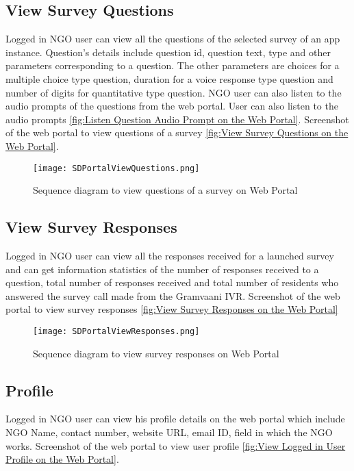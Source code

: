 \subsection{View Survey Questions}
Logged in NGO user can view all the questions of the selected survey of an app instance. Question's details include question id, question text, type and other parameters corresponding to a question. The other parameters are choices for a multiple choice type question, duration for a voice response type question and number of digits for quantitative type question. NGO user can also listen to the audio prompts of the questions from the web portal. User can also listen to the audio prompts \ref{fig:Listen Question Audio Prompt on the Web Portal}. Screenshot of the web portal to view questions of a survey \ref{fig:View Survey Questions on the Web Portal}.\\
\begin{figure}[H]
    \centering
	\texttt{[image: SDPortalViewQuestions.png]}
    \caption{Sequence diagram to view questions of a survey on Web Portal}
    \label{fig:Sequence diagram to view questions of a survey on Web Portal}
\end{figure}
\subsection{View Survey Responses}
Logged in NGO user can view all the responses received for a launched survey and can get information statistics of the number of responses received to a question, total number of responses received and total number of residents who answered the survey call made from the Gramvaani IVR. Screenshot of the web portal to view survey responses \ref{fig:View Survey Responses on the Web Portal}\\
\begin{figure}[H]
    \centering
	\texttt{[image: SDPortalViewResponses.png]}
    \caption{Sequence diagram to view survey responses on Web Portal}
    \label{fig:Sequence diagram to view survey responses on Web Portal}
\end{figure}

\subsection{Profile}
Logged in NGO user can view his profile details on the web portal which include NGO Name, contact number, website URL, email ID, field in which the NGO works. Screenshot of the web portal to view user profile \ref{fig:View Logged in User Profile on the Web Portal}.

